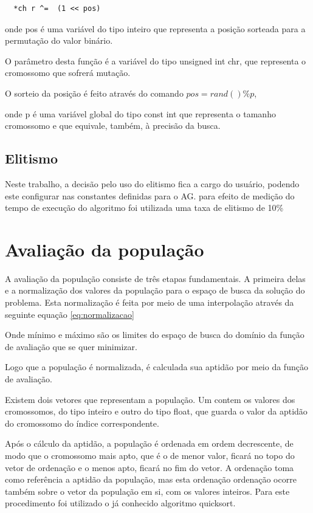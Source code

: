 \documentclass[
    12pt,               %
    oneside,%
    a4paper,            %
    english,            %
    french,             %
    spanish,            %
    brazil,             %
    ]{abntex2}
\begin{document}
  \begin{verbatim}
  *ch r ^=  (1 << pos)
  \end{verbatim}

  onde pos é uma variável do tipo inteiro que representa a posição sorteada para a permutação do valor binário.

  O parâmetro desta função é a variável do tipo unsigned int chr, que representa o cromossomo que sofrerá mutação. 

  O sorteio da posição é feito através do comando $pos = rand() \% p$,

  onde p é uma variável global do tipo const int que representa o tamanho cromossomo e que equivale, também, à precisão da busca.

\subsection{Elitismo}
  
  Neste trabalho, a decisão pelo uso do elitismo fica a cargo do usuário, podendo este configurar nas constantes definidas para o AG. para efeito de medição do tempo de execução do algoritmo foi utilizada uma taxa de elitismo de 10\%

\section{Avaliação da população}

  A avaliação da população consiste de três etapas fundamentais. A primeira delas e a normalização dos valores da população para o espaço de busca da solução do problema. Esta normalização é  feita por meio de uma interpolação através da seguinte equação \ref{eq:normalizacao}

  

  Onde mínimo e máximo são os limites do espaço de busca do domínio da função de avaliação que se quer minimizar. 

  Logo que a população é normalizada, é calculada sua aptidão por meio da função de avaliação.

  Existem dois vetores que representam a população. Um contem os valores dos cromossomos, do tipo inteiro e outro do tipo float, que guarda o valor da aptidão do cromossomo do índice correspondente. 

  Após o cálculo da aptidão, a população é ordenada em ordem decrescente, de modo que o cromossomo mais apto, que é o de menor valor, ficará no topo do vetor de ordenação e o menos apto, ficará no fim do vetor. A ordenação toma como referência a aptidão da população, mas esta ordenação ordenação ocorre também sobre o vetor da população em si, com os valores inteiros. Para este procedimento foi utilizado o já conhecido algoritmo quicksort.
\end{document}
